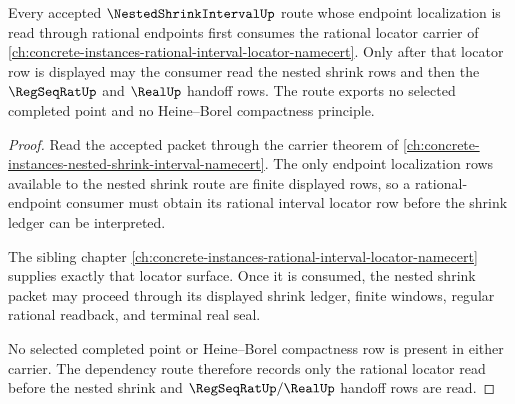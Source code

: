 \begin{theorem}
\label{thm:nested-shrink-interval-rational-locator-route}
Every accepted $\NestedShrinkIntervalUp$ route whose endpoint localization is read through rational endpoints first consumes the rational locator carrier of \autoref{ch:concrete-instances-rational-interval-locator-namecert}. Only after that locator row is displayed may the consumer read the nested shrink rows and then the $\RegSeqRatUp$ and $\RealUp$ handoff rows. The route exports no selected completed point and no Heine--Borel compactness principle.
\end{theorem}
\begin{proof}
Read the accepted packet through the carrier theorem of \autoref{ch:concrete-instances-nested-shrink-interval-namecert}. The only endpoint localization rows available to the nested shrink route are finite displayed rows, so a rational-endpoint consumer must obtain its rational interval locator row before the shrink ledger can be interpreted.

The sibling chapter \autoref{ch:concrete-instances-rational-interval-locator-namecert} supplies exactly that locator surface. Once it is consumed, the nested shrink packet may proceed through its displayed shrink ledger, finite windows, regular rational readback, and terminal real seal.

No selected completed point or Heine--Borel compactness row is present in either carrier. The dependency route therefore records only the rational locator read before the nested shrink and $\RegSeqRatUp/\RealUp$ handoff rows are read.
\end{proof}
